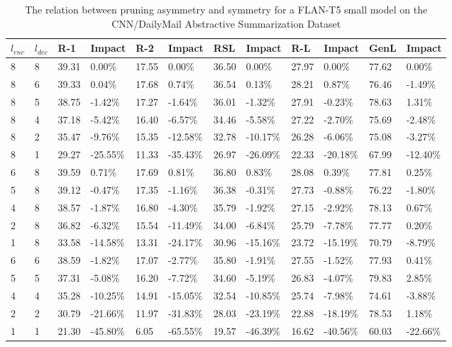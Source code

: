 \begin{table*}[!ht]
    \centering
    \caption{The relation between pruning asymmetry and symmetry for a FLAN-T5 small model on the CNN/DailyMail Abstractive Summarization Dataset}
    \small
    \begin{tabular}{|l|l|l|l|l|l|l|l|l|l|l|l|}
    \hline
        $l_{enc}$ & $l_{dec}$ & R-1 & Impact & R-2 & Impact & RSL & Impact & R-L & Impact & GenL & Impact \\ \hline
        8 & 8 & 39.31 & 0.00\% & 17.55 & 0.00\% & 36.50 & 0.00\% & 27.97 & 0.00\% & 77.62 & 0.00\% \\ \hline
        8 & 6 & 39.33 & 0.04\% & 17.68 & 0.74\% & 36.54 & 0.13\% & 28.21 & 0.87\% & 76.46 & -1.49\% \\ \hline
        8 & 5 & 38.75 & -1.42\% & 17.27 & -1.64\% & 36.01 & -1.32\% & 27.91 & -0.23\% & 78.63 & 1.31\% \\ \hline
        8 & 4 & 37.18 & -5.42\% & 16.40 & -6.57\% & 34.46 & -5.58\% & 27.22 & -2.70\% & 75.69 & -2.48\% \\ \hline
        8 & 2 & 35.47 & -9.76\% & 15.35 & -12.58\% & 32.78 & -10.17\% & 26.28 & -6.06\% & 75.08 & -3.27\% \\ \hline
        8 & 1 & 29.27 & -25.55\% & 11.33 & -35.43\% & 26.97 & -26.09\% & 22.33 & -20.18\% & 67.99 & -12.40\% \\ \hline
        6 & 8 & 39.59 & 0.71\% & 17.69 & 0.81\% & 36.80 & 0.83\% & 28.08 & 0.39\% & 77.81 & 0.25\% \\ \hline
        5 & 8 & 39.12 & -0.47\% & 17.35 & -1.16\% & 36.38 & -0.31\% & 27.73 & -0.88\% & 76.22 & -1.80\% \\ \hline
        4 & 8 & 38.57 & -1.87\% & 16.80 & -4.30\% & 35.79 & -1.92\% & 27.15 & -2.92\% & 78.13 & 0.67\% \\ \hline
        2 & 8 & 36.82 & -6.32\% & 15.54 & -11.49\% & 34.00 & -6.84\% & 25.79 & -7.78\% & 77.77 & 0.20\% \\ \hline
        1 & 8 & 33.58 & -14.58\% & 13.31 & -24.17\% & 30.96 & -15.16\% & 23.72 & -15.19\% & 70.79 & -8.79\% \\ \hline
        6 & 6 & 38.59 & -1.82\% & 17.07 & -2.77\% & 35.80 & -1.91\% & 27.55 & -1.52\% & 77.93 & 0.41\% \\ \hline
        5 & 5 & 37.31 & -5.08\% & 16.20 & -7.72\% & 34.60 & -5.19\% & 26.83 & -4.07\% & 79.83 & 2.85\% \\ \hline
        4 & 4 & 35.28 & -10.25\% & 14.91 & -15.05\% & 32.54 & -10.85\% & 25.74 & -7.98\% & 74.61 & -3.88\% \\ \hline
        2 & 2 & 30.79 & -21.66\% & 11.97 & -31.83\% & 28.03 & -23.19\% & 22.88 & -18.19\% & 78.53 & 1.18\% \\ \hline
        1 & 1 & 21.30 & -45.80\% & 6.05 & -65.55\% & 19.57 & -46.39\% & 16.62 & -40.56\% & 60.03 & -22.66\% \\ \hline
    \end{tabular}
    \label{tab:asym-small-cnndm}
\end{table*}

